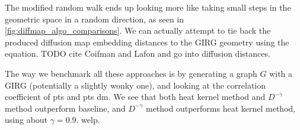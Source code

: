 The modified random walk ends up looking more like taking small steps in the geometric space in a random direction, as seen in \cref{fig:diffmap_algo_comparisons}. We can actually attempt to tie back the produced diffusion map embedding distances to the GIRG geometry using the equation. TODO cite Coifman and Lafon and go into diffusion distances.







The way we benchmark all these approaches is by generating a graph $G$ with a GIRG (potentially a slightly wonky one), and looking at the correlation coefficient of pts and pts dm. We see that both heat kernel method and $D^{-\gamma}$ method outperform baseline, and $D^{-\gamma}$ method outperforms heat kernel method, using about $\gamma=0.9$. welp.


